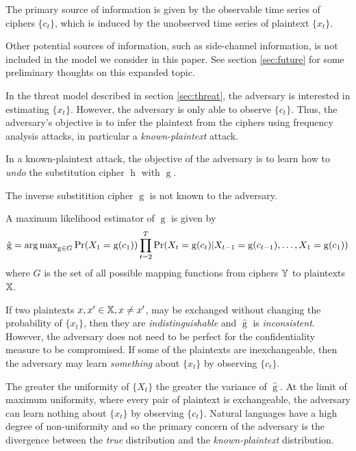 \documentclass[final,
  11pt,
]{article}
\begin{document}
\label{sec:threat} The primary source of information is given by the
observable time series of ciphers \(\{c_t\}\), which is induced by the
unobserved time series of plaintext \(\{x_t\}\).

Other potential sources of information, such as side-channel
information, is not included in the model we consider in this paper. See
section \ref{sec:future} for some preliminary thoughts on this expanded
topic.

In the threat model described in section \ref{sec:threat}, the adversary
is interested in estimating \(\{x_t\}\). However, the adversary is only
able to observe \(\{c_t\}\). Thus, the adversary's objective is to infer
the plaintext from the ciphers using frequency analysis attacks, in
particular a \emph{known-plaintext} attack.

In a known-plaintext attack, the objective of the adversary is to learn
how to \emph{undo} the substitution cipher \(\operatorname{h}\) with
\(\operatorname{g}\).

\begin{assumption}
The inverse substitition cipher $\operatorname{g}$ is not known to the adversary.
\end{assumption}

A maximum likelihood estimator of \(\operatorname{g}\) is given by \[
    \hat{\operatorname{g}} = \operatorname{arg\,max}_{\operatorname{g} \in G}
    \Pr(X_1 = \operatorname{g}(c_1)) \prod_{t=2}^{T} \Pr(X_t =
    \operatorname{g}(c_t) | X_{t-1} = \operatorname{g}(c_{t-1}),
            \ldots, X_1 = \operatorname{g}(c_1))
\] where \(G\) is the set of all possible mapping functions from ciphers
\(\mathbb{Y}\) to plaintexts \(\mathbb{X}\).

If two plaintexts \(x,x' \in \mathbb{X}, x \neq x'\), may be exchanged
without changing the probability of \(\{x_t\}\), then they are
\emph{indistinguishable} and \(\hat{\operatorname{g}}\) is
\emph{inconsistent}. However, the adversary does not need to be perfect
for the confidentiality measure to be compromised. If some of the
plaintexts are inexchangeable, then the adversary may learn
\emph{something} about \(\{x_t\}\) by observing \(\{c_t\}\).

The greater the uniformity of \(\{X_t\}\) the greater the variance of
\(\hat{\operatorname{g}}\). At the limit of maximum uniformity, where
every pair of plaintext is exchangeable, the adversary can learn nothing
about \(\{x_t\}\) by observing \(\{c_t\}\). Natural languages have a
high degree of non-uniformity and so the primary concern of the
adversary is the divergence between the \emph{true} distribution and the
\emph{known-plaintext} distribution.
\end{document}
